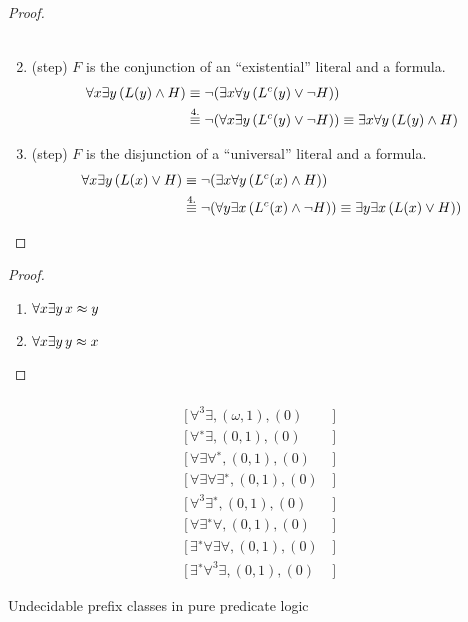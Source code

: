 \begin{proof}
\begin{enumerate}
\begin{align*}
		\end{align*}
		\item (step) $F$ is the conjunction of an “existential” literal and a formula.
		\begin{align*}
		\forall x \exists y\,({L(y)\land H}) 
		&\equiv\lnot(\exists x\forall y \,({L^c(y) \lor \lnot H})) \\
		&\defEV[4.]\lnot(\forall x\exists y \,({L^c(y) \lor \lnot H}) )
		\equiv \exists x\forall y\,(L(y)\land H)
		\end{align*}
		\item (step) $F$ is the disjunction of a “universal” literal and a formula.
		\begin{align*}
		\forall x \exists y\,(L(x)\lor H) 
		&\equiv \lnot (\exists x\forall y\,(L^c(x) \land H)) \\
		&\defEV[4.]\lnot (\forall y\exists x\,(L^c(x) \land\lnot H)) 
		\equiv \exists y \exists x\,(L(x)\lor H))\\
		\end{align*}
	\end{enumerate}
\end{proof}

\begin{proof}
	\begin{enumerate}
		\item $\forall x \exists y\, x\mEQ y$
		\item $\forall x \exists y\, y\mEQ x$
	\end{enumerate}
		
\end{proof}



\begin{table}[hbt]
	\begin{align*}
	[\,\forall\exists\forall, (\omega, 1), (0)&\,] \tag{Kahr 1962}
	\\
	[\,\forall^3 \exists, (\omega, 1), (0)&\,] \tag{Surányi 1959}
	\\
	[\,\forall^{∗} \exists, (0, 1), (0)&\,] \tag{Kalmár-Surányi 1950}
	\\
	[\,\forall\exists\forall^{∗} , (0, 1), (0)&\,]  \tag{Denton 1960}
	\\
	[\,\forall\exists\forall\exists^{∗}, (0, 1), (0)&\,] \tag{Gurevich 1966}
	\\
	[\,\forall^3 \exists^{∗} , (0, 1), (0)&\,] \tag{Kalmár-Surányi 1947}
	\\
	[\,\forall\exists^{∗} \forall, (0, 1), (0)&\,] \tag{Kostyrko-Genenz 1964}
	\\
	[\,\exists^{∗} \forall\exists\forall, (0, 1), (0)&\,] \tag{Surányi 1959}
	\\
	[\,\exists^{∗} \forall^3 \exists, (0, 1), (0)&\,] \tag{Surányi 1959}
	\end{align*}
	\caption{Undecidable prefix classes in pure predicate logic}
	\label{tab:undecidable:PurePredicateLogic}
\end{table}

